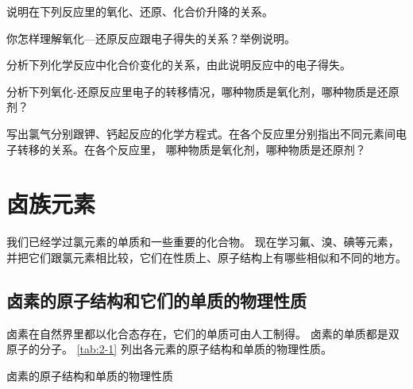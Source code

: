 \begin{Practice}[习题]
  \begin{question}
    \item 说明在下列反应里的氧化、还原、化合价升降的关系。
    \begin{tasks}
      \task {}
      \task {}
      \task {}
      \task {}
    \end{tasks}
    \item 你怎样理解氧化—还原反应跟电子得失的关系？举例说明。
    \item 分析下列化学反应中化合价变化的关系，由此说明反应中的电子得失。
    \begin{tasks}
      \task {}
      \task {}
    \end{tasks}
    \item 分析下列氧化-还原反应里电子的转移情况，哪种物质是氧化剂，哪种物质是还原剂？
    \begin{tasks}
      \task {}
      \task {}
    \end{tasks}
    \item 写出氯气分别跟钾、钙起反应的化学方程式。在各个反应里分别指出不同元素间电子转移的关系。在各个反应里， 哪种物质是氧化剂，哪种物质是还原剂？
  \end{question}
\end{Practice}

\section{卤族元素}
我们已经学过氯元素的单质和一些重要的化合物。
现在学习氟、溴、碘等元素，并把它们跟氯元素相比较，它们在性质上、原子结构上有哪些相似和不同的地方。

\subsection{卤素的原子结构和它们的单质的物理性质}
卤素在自然界里都以化合态存在，它们的单质可由人工制得。
卤素的单质都是双原子的分子。
\cref{tab:2-1} 列出各元素的原子结构和单质的物理性质。

\begin{table}
  \caption{卤素的原子结构和单质的物理性质}\label{tab:2-1}
\end{table}

